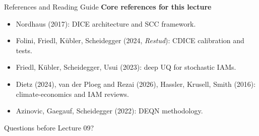 \documentclass[aspectratio=169,11pt]{beamer}
\newcommand{\emphc}[1]{\textcolor{harvardcrimson}{#1}}
\begin{document}
\begin{frame}{References and Reading Guide}
\small
\textbf{Core references for this lecture}
\begin{itemize}
    \item Nordhaus (2017): DICE architecture and SCC framework.
    \item Folini, Friedl, K\"ubler, Scheidegger (2024, \textit{Restud}): CDICE calibration and tests.
    \item Friedl, K\"ubler, Scheidegger, Usui (2023): deep UQ for stochastic IAMs.
    \item Dietz (2024), van der Ploeg and Rezai (2026), Hassler, Krusell, Smith (2016): climate-economics and IAM reviews.
    \item Azinovic, Gaegauf, Scheidegger (2022): DEQN methodology.
\end{itemize}

\vspace{0.3cm}
\begin{center}
{\LARGE \emphc{Questions before Lecture 09?}}
\end{center}
\end{frame}
\end{document}

